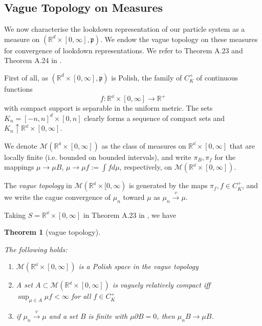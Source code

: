 \documentclass[12pt]{article}
\newtheorem{theorem}{Theorem}[section]
\newcommand{\IR}{\mathbb R}
\begin{document}
\subsection{Vague Topology on Measures}\label{sec: Empirical Measure Topology}

We now characterise the lookdown representation
of our particle system
as a measure on 
$(\IR^d \times [0, \infty], \mathfrak{p})$.
We endow the vague topology
on these measures for
convergence of lookdown representations.
We refer to Theorem A.23 and Theorem A.24 in \cite{kallenberg1997foundations}.

First of all,
as $(\IR^d \times [0, \infty], \mathfrak{p})$
is Polish,
the family of $C^{+}_K$ of continuous functions
$$f: \mathbb{R^d} \times [0, \infty] \to \IR^{+}$$
with compact support
is separable in the uniform metric. 
The sets $K_n =[-n, n]^d \times [0,n]$ clearly forms a sequence of compact sets and $K_n \uparrow \mathbb{R^d} \times [0, \infty]$.

We denote $\mathcal{M}(\mathbb{R^d} \times [0, \infty])$ as the class of measures on $\mathbb{R^d} \times [0, \infty]$ that are 
locally finite (i.e. bounded on bounded intervals),
and write $\pi_B, \pi_f$ 
for the mappings 
$\mu \to \mu B$, $\mu \to \mu f := \int f d\mu$,
respectively,
on $\mathcal{M}(\mathbb{R^d} \times [0, \infty])$.

The \textit{vague topology} in $\mathcal{M}(\mathbb{R^d} \times [0, \infty)$ is generated by the maps $\pi_f, f \in C^{+}_K$, and 
we write the cague convergence of $\mu_n$ toward $\mu$
as $\mu_n \xrightarrow{v} \mu$.

Taking $S= \mathbb{R^d} \times [0, \infty]$
in Theorem A.23
in \cite{kallenberg1997foundations},
we have
\begin{theorem}[vague topology]
\label{teo: Kallenberg vague results}

The following holds:
\begin{enumerate}
    \item $\mathcal{M}(\mathbb{R^d} \times [0, \infty])$ is a Polish space in the vague topology
    \item A set $A \subset \mathcal{M}(\mathbb{R^d} \times [0, \infty])$ is vaguely relatively compact iff 
    $\sup_{\mu \in A} \mu f < \infty$ for all $f \in C^{+}_K$
    \item if $\mu_n \xrightarrow{v} \mu$ and a set $B$ is finite with $\mu \partial B = 0$, then $\mu_n B \to \mu B$.
\end{enumerate}

\end{theorem}
\end{document}
